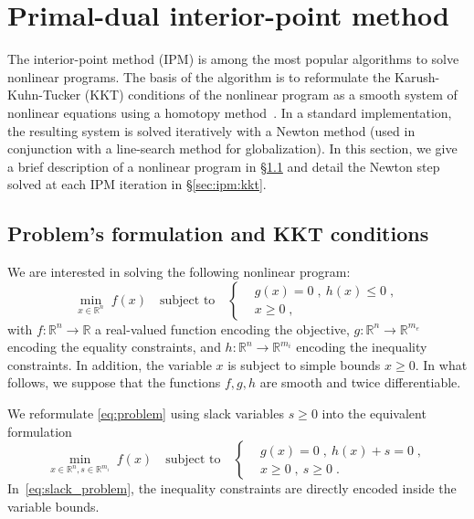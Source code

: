 \section{Primal-dual interior-point method}
The interior-point method (IPM) is among the most popular algorithms
to solve nonlinear programs. The basis of the algorithm is to
reformulate the Karush-Kuhn-Tucker (KKT) conditions of the nonlinear program as a smooth
system of nonlinear equations using a homotopy method~\cite{nocedal_numerical_2006}.
In a standard implementation, the
resulting system is solved iteratively with a Newton method (used in conjunction
with a line-search method for globalization). In this section, we
give a brief description of a nonlinear program in \S\ref{sec:ipm:problem}
and detail the Newton step solved at each IPM iteration in \S\ref{sec:ipm:kkt}.

\subsection{Problem's formulation and KKT conditions}
\label{sec:ipm:problem}
We are interested in solving the following nonlinear program:
\begin{equation}
  \label{eq:problem}
    \min_{x \in \mathbb{R}^n} \;  f(x)
\quad \text{subject to}\quad
\left\{
  \begin{aligned}
    & g(x) = 0 \; , ~ h(x) \leq 0 \; , \\
      & x \geq 0  \; ,
  \end{aligned}
\right.
\end{equation}
with $f:\mathbb{R}^n \to \mathbb{R}$ a real-valued function
encoding the objective, $g: \mathbb{R}^n \to \mathbb{R}^{m_e}$
encoding the equality constraints, and $h: \mathbb{R}^{n} \to
\mathbb{R}^{m_i}$ encoding the inequality constraints.
In addition, the variable $x$ is subject to simple bounds $x \geq 0$.
In what follows, we suppose that the functions $f, g, h$ are smooth
and twice differentiable.

We reformulate \eqref{eq:problem} using slack variables $s \geq 0$
into the equivalent formulation
\begin{equation}
  \label{eq:slack_problem}
    \min_{x \in \mathbb{R}^n, s \in \mathbb{R}^{m_i}} \;  f(x)
    \quad \text{subject to} \quad
    \left\{
  \begin{aligned}
    & g(x) = 0 \; , ~ h(x) + s = 0 \; , \\
      & x \geq 0  \; , ~ s \geq 0  \; .
  \end{aligned}
  \right.
\end{equation}
In~\eqref{eq:slack_problem}, the inequality constraints
are directly encoded inside the variable bounds.

